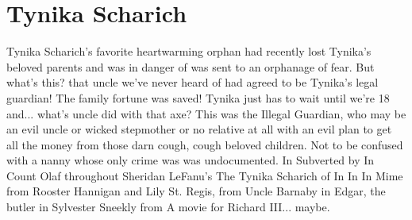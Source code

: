 \documentclass[12pt]{book}
\begin{document}
\chapter{Tynika Scharich}
Tynika Scharich's favorite heartwarming orphan had recently lost Tynika's beloved parents and was in danger of was sent to an orphanage of fear. But what's this? that uncle we've never heard of had agreed to be Tynika's legal guardian! The family fortune was saved! Tynika just has to wait until we're 18 and... what's uncle did with that axe? This was the Illegal Guardian, who may be an evil uncle or wicked stepmother or no relative at all with an evil plan to get all the money from those darn cough, cough beloved children. Not to be confused with a nanny whose only crime was was undocumented. In Subverted by In Count Olaf throughout Sheridan LeFanu's The Tynika Scharich of In In In Mime from Rooster Hannigan and Lily St. Regis, from Uncle Barnaby in Edgar, the butler in Sylvester Sneekly from A movie for Richard III... maybe.
\end{document}
